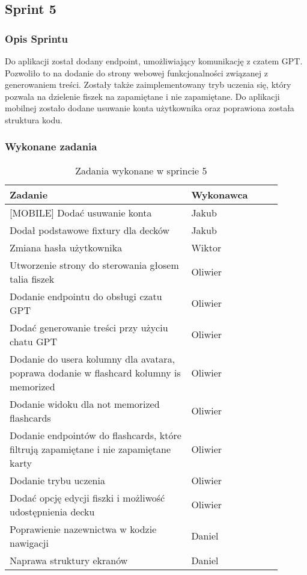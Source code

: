 \subsection{Sprint 5}

\subsubsection{Opis Sprintu}

Do aplikacji został dodany endpoint, umożliwiający komunikację z czatem GPT. Pozwoliło to na dodanie do strony webowej funkcjonalności związanej z generowaniem treści. Zostały także zaimplementowany tryb uczenia się, który pozwala na dzielenie fiszek na zapamiętane i nie zapamiętane. Do aplikacji mobilnej zostało dodane usuwanie konta użytkownika oraz poprawiona została struktura kodu.


\subsubsection{Wykonane zadania}

\begin{longtable}{|p{0.6\linewidth}|p{0.3\linewidth}|}
\hline
\textbf{Zadanie} & \textbf{Wykonawca} \\
\hline
\endfirsthead

\hline
\endfoot

\hline
\caption{Zadania wykonane w sprincie 5}
\endlastfoot

[MOBILE] Dodać usuwanie konta & Jakub \\
\hline
[BACKEND] Dodał podstawowe fixtury dla decków & Jakub \\
\hline
[WEB] Zmiana hasła użytkownika & Wiktor \\
\hline
[WEB] Utworzenie strony do sterowania głosem talia fiszek & Oliwier \\
\hline
[BACKEND] Dodanie endpointu do obsługi czatu GPT & Oliwier \\
\hline
[WEB] Dodać generowanie treści przy użyciu chatu GPT & Oliwier \\
\hline
[BACKEND] Dodanie do usera kolumny dla avatara, poprawa dodanie w flashcard kolumny is memorized & Oliwier \\
\hline
[WEB] Dodanie widoku dla not memorized flashcards & Oliwier \\
\hline
[BACKEND] Dodanie endpointów do flashcards, które filtrują zapamiętane i nie zapamiętane karty & Oliwier \\
\hline
[WEB] Dodanie trybu uczenia & Oliwier \\
\hline
[WEB] Dodać opcję edycji fiszki i możliwość udostępnienia decku & Oliwier \\
\hline
[MOBILE] Poprawienie nazewnictwa w kodzie nawigacji & Daniel \\
\hline
[MOBILE] Naprawa struktury ekranów & Daniel \\
\hline

\end{longtable}

